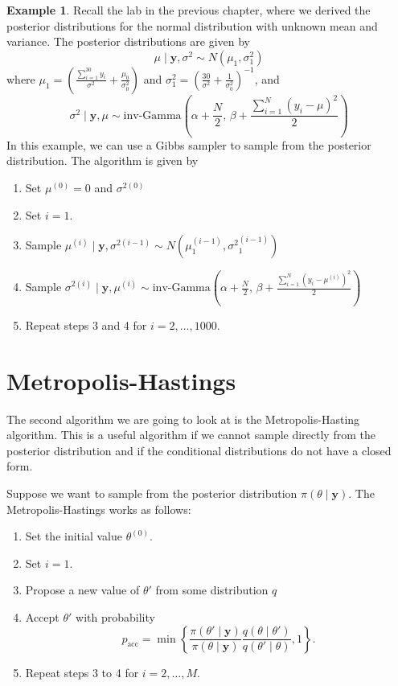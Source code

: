 \documentclass[
]{book}
\theoremstyle{definition}
\theoremstyle{definition}
\newtheorem{example}{Example}[chapter]
\theoremstyle{definition}
\theoremstyle{definition}
\theoremstyle{remark}
\begin{document}
\begin{example}

Recall the lab in the previous chapter, where we derived the posterior distributions for the normal distribution with unknown mean and variance. The posterior distributions are given by
\[
\mu \mid \boldsymbol{y}, \sigma^2 \sim N(\mu_1, \sigma^2_1)
\]
where \(\mu_1 =\left(\frac{\sum_{i=1}^{30}y_i}{\sigma^2} + \frac{\mu_0}{\sigma_0^2} \right)\) and \(\sigma^2_1 = \left(\frac{30}{\sigma^2} + \frac{1}{\sigma_0^2}\right)^{-1}\), and
\[
\sigma^2 \mid \boldsymbol{y}, \mu \sim \textrm{inv-Gamma}\left(\alpha + \frac{N}{2}, \,\beta + \frac{\sum_{i=1}^N (y_i - \mu)^2}{2}\right)
\]
In this example, we can use a Gibbs sampler to sample from the posterior distribution. The algorithm is given by

\begin{enumerate}
\def\labelenumi{\arabic{enumi}.}
\item
  Set \(\mu^{(0)} = 0\) and \(\sigma^{2(0)}\)
\item
  Set \(i = 1\).
\item
  Sample \(\mu^{(i)} \mid \boldsymbol{y}, \sigma^{2(i-1)} \sim N(\mu_1^{(i-1)}, {\sigma^2}_1^{(i-1)})\)
\item
  Sample \(\sigma^{2(i)} \mid \boldsymbol{y}, \mu^{(i)} \sim \textrm{inv-Gamma}\left(\alpha + \frac{N}{2}, \,\beta + \frac{\sum_{i=1}^N (y_i - \mu^{(i)})^2}{2}\right)\)
\item
  Repeat steps 3 and 4 for \(i = 2, \ldots, 1000\).
\end{enumerate}

\end{example}

\hypertarget{metropolis-hastings}{%
\section{Metropolis-Hastings}\label{metropolis-hastings}}

The second algorithm we are going to look at is the Metropolis-Hasting algorithm. This is a useful algorithm if we cannot sample directly from the posterior distribution and if the conditional distributions do not have a closed form.

Suppose we want to sample from the posterior distribution \(\pi(\theta \mid \boldsymbol{y})\). The Metropolis-Hastings works as follows:

\begin{enumerate}
\def\labelenumi{\arabic{enumi}.}
\item
  Set the initial value \(\theta^{(0)}\).
\item
  Set \(i = 1\).
\item
  Propose a new value of \(\theta'\) from some distribution \(q\)
\item
  Accept \(\theta'\) with probability
  \[
  p_{\textrm{acc}} = \min\left\{\frac{\pi(\theta' \mid \boldsymbol{y})}{\pi(\theta \mid \boldsymbol{y})}\frac{q(\theta \mid \theta')}{q(\theta' \mid \theta)}, 1\right\}.
  \]
\item
  Repeat steps 3 to 4 for \(i = 2, \ldots, M\).
\end{enumerate}
\end{document}
